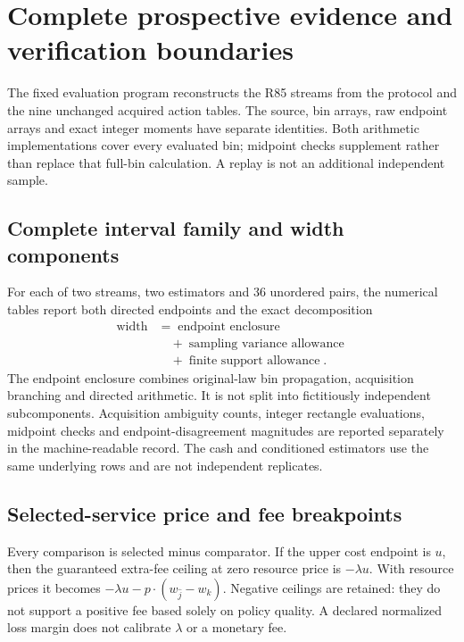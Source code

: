 \section{Complete prospective evidence and verification boundaries}\label{app:evidence86}
The fixed evaluation program reconstructs the R85 streams from the protocol and the nine unchanged acquired action tables. The source, bin arrays, raw endpoint arrays and exact integer moments have separate identities. Both arithmetic implementations cover every evaluated bin; midpoint checks supplement rather than replace that full-bin calculation. A replay is not an additional independent sample.

\subsection{Complete interval family and width components}
For each of two streams, two estimators and 36 unordered pairs, the numerical tables report both directed endpoints and the exact decomposition
\begin{align*}
 \operatorname{width}&=\operatorname{endpoint\ enclosure}\\
 &\quad+\operatorname{sampling\ variance\ allowance}\\
 &\quad+\operatorname{finite\ support\ allowance}.
\end{align*}
The endpoint enclosure combines original-law bin propagation, acquisition branching and directed arithmetic. It is not split into fictitiously independent subcomponents. Acquisition ambiguity counts, integer rectangle evaluations, midpoint checks and endpoint-disagreement magnitudes are reported separately in the machine-readable record. The cash and conditioned estimators use the same underlying rows and are not independent replicates.



\subsection{Selected-service price and fee breakpoints}
Every comparison is selected minus comparator. If the upper cost endpoint is $u$, then the guaranteed extra-fee ceiling at zero resource price is $-\lambda u$. With resource prices it becomes $-\lambda u-p\cdot(w_{\widehat j}-w_k)$. Negative ceilings are retained: they do not support a positive fee based solely on policy quality. A declared normalized loss margin does not calibrate $\lambda$ or a monetary fee.

